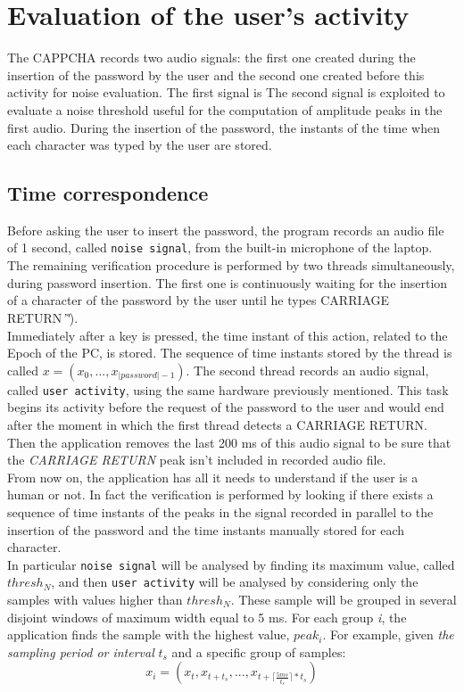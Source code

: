 \section{Evaluation of the user's activity}
The CAPPCHA records two audio signals: the first one created during the insertion of the password by the user and the second one created before this activity for noise evaluation. The first signal is The second signal is exploited to evaluate a noise threshold useful for the computation of amplitude peaks in the first audio.
During the insertion of the password, the instants of the time when each character was typed by the user are stored. 

\subsection{Time correspondence}\label{AcCAPPCHA:time_correspondence}
Before asking the user to insert the password, the program records an audio file of 1 second, called \texttt{noise signal}, from the built-in microphone of the laptop. The remaining verification procedure is performed by two threads simultaneously, during password insertion. The first one is continuously waiting for the insertion of a character of the password by the user until he types CARRIAGE RETURN\textit{'\r'}).\\
Immediately after a key is pressed, the time instant of this action, related to the Epoch of the PC, is stored. The sequence of time instants stored by the thread is called $x=(x_0, ..., x_{|password|-1})$. The second thread records an audio signal, called \texttt{user activity}, using the same hardware previously mentioned. This task begins its activity before the request of the password to the user and would end after the moment in which the first thread detects a CARRIAGE RETURN. Then the application removes the last 200 ms of this audio signal to be sure that the \textit{CARRIAGE RETURN} peak isn't included in recorded audio file.\\
From now on, the application has all it needs to understand if the user is a human or not. In fact the verification is performed by looking if there exists a sequence of time instants of the peaks in the signal recorded in parallel to the insertion of the password and the time instants manually stored for each character.\\
In particular \texttt{noise signal} will be analysed by finding its maximum value, called $thresh_N$, and then \texttt{user activity} will be analysed by considering only the samples with values higher than $thresh_N$. These sample will be grouped in several disjoint windows of maximum width equal to 5 ms. For each group \textit{i}, the application finds the sample with the highest value, $peak_i$. For example, given \textit{the sampling period or interval} $t_s$ and a specific group of samples: $$x_i = (x_t, x_{t+t_s}, ..., x_{t+\lceil \frac{5ms}{t_s}\rceil * t_s})$$
